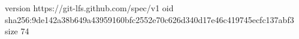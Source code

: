 version https://git-lfs.github.com/spec/v1
oid sha256:9de142a38b649a43959160bfc2552e70c626d340d17e46c419745ecfc137abf3
size 74
